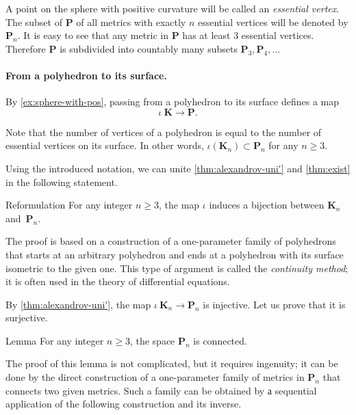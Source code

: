 A point on the sphere with positive curvature will be called an \emph{essential vertex}.
The subset of $\mathbf{P}$ of all metrics with exactly $n$ essential vertices will be denoted by $\mathbf{P}_n$.
It is easy to see that any metric in $\mathbf{P}$ has at least 3 essential vertices.
Therefore $\mathbf{P}$ is subdivided into countably many subsets
 $\mathbf{P}_3,\mathbf{P}_4,\dots$

\paragraph{From a polyhedron to its surface.}

By \ref{ex:sphere-with-pos}, passing from a polyhedron to its surface defines a map
\[\iota\:\mathbf{K}\to \mathbf{P}.\]

Note that the number of vertices of a polyhedron is equal to the number of essential vertices on its surface.
In other words, $\iota(\mathbf{K}_n)\subset \mathbf{P}_n$ for any $n\ge 3$.

Using the introduced notation, we can unite \ref{thm:alexandrov-uni'} and \ref{thm:exist} in the following statement.

\begin{thm}{Reformulation}
For any integer $n\ge 3$,
the map $\iota$ induces a bijection between $\mathbf{K}_n$ and~$\mathbf{P}_n$.
\end{thm}

The proof is based on a construction of a one-parameter family of polyhedrons that starts at an arbitrary polyhedron
and ends at a polyhedron with its surface isometric to the given one.
This type of argument is called the \textit{continuity method}; it is often used in the theory of differential equations.


By \ref{thm:alexandrov-uni'}, the map $\iota\:\mathbf{K}_n\to\mathbf{P}_n$ is injective.
Let us prove that it is surjective.

\begin{thm}{Lemma}
For any integer $n\ge 3$, the space $\mathbf{P}_n$ is connected.
\end{thm}

The proof of this lemma is not complicated, but it requires ingenuity;
it can be done by the direct construction of a one-parameter family of metrics in $\mathbf{P}_n$ that connects two given metrics.
Such a family can be obtained by а sequential application of the following construction and its inverse.

